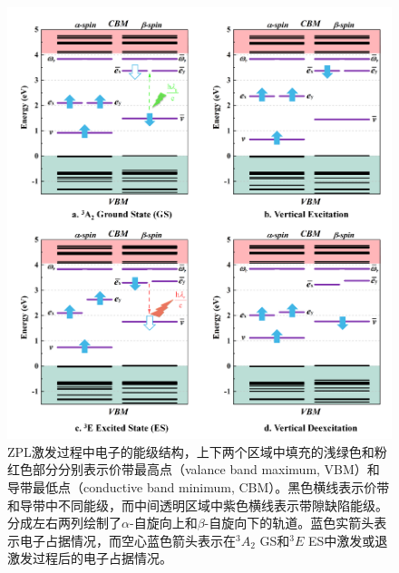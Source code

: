 \documentclass[type = bachelor]{whu-thesis}
\begin{document}
\begin{figure}
  \centering
  \includegraphics[width=1.0\textwidth]{figures/Chapter 2/Excitation Process.png}
  \caption[ZPL激发过程中电子的能级结构]{ZPL激发过程中电子的能级结构，上下两个区域中填充的浅绿色和粉红色部分分别表示价带最高点（valance band maximum, VBM）和导带最低点（conductive band minimum, CBM）。黑色横线表示价带和导带中不同能级，而中间透明区域中紫色横线表示带隙缺陷能级。分成左右两列绘制了$\alpha$-自旋向上和$\beta$-自旋向下的轨道。蓝色实箭头表示电子占据情况，而空心蓝色箭头表示在$^3A_2$ GS和$^3E$ ES中激发或退激发过程后的电子占据情况。}
  \label{fig: Excitation Process}
\end{figure}
\end{document}
